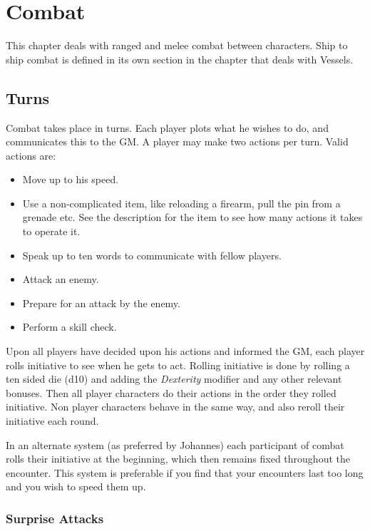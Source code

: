 \chapter{Combat}
\label{chap:Combat}

This chapter deals with ranged and melee combat between characters. Ship to ship
combat is defined in its own section in the chapter that deals with Vessels.

\section{Turns}
\label{sec:6-Turns}

Combat takes place in turns. Each player plots what he wishes to do, and
communicates this to the GM. A player may make two actions per turn. Valid
actions are:

\begin{itemize}
\item Move up to his speed.
\item Use a non-complicated item, like reloading a firearm, pull the pin from a
  grenade etc. See the description for the item to see how many actions it takes
  to operate it.
\item Speak up to ten words to communicate with fellow players.
\item Attack an enemy.
\item Prepare for an attack by the enemy.
\item Perform a skill check.
\end{itemize}

Upon all players have decided upon his actions and informed the GM, each player
rolls initiative to see when he gets to act. Rolling initiative is done by
rolling a ten sided die (d10) and adding the \emph{Dexterity} modifier and any
other relevant bonuses. Then all player characters do their actions in the
order they rolled initiative. Non player characters behave in the same way,
and also reroll their initiative each round.

In an alternate system (as preferred by Johannes) each participant of combat
rolls their initiative at the beginning, which then remains fixed throughout the
encounter. This system is preferable if you find that your encounters last too
long and you wish to speed them up.

\subsection{Surprise Attacks}
\label{sub:6-Surprise Attacks}

